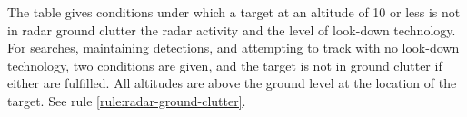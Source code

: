{\begin{twocolumntablefloat}[tp]
\begin{twocolumntable}
\begin{tabularx}{0.9\linewidth}{cCcCCC}
\bottomrule
\end{tabularx}
\begin{tablenote}{0.9\linewidth}\footnotesize
The table gives conditions under which a target at an altitude of 10 or less is not in radar ground clutter the radar activity and the level of look-down technology. For searches, maintaining detections, and attempting to track with no look-down technology, two conditions are given, and the target is not in ground clutter if either are fulfilled. All altitudes are above the ground level at the location of the target. See rule \ref{rule:radar-ground-clutter}.
\end{tablenote}

\end{twocolumntable}
\end{twocolumntablefloat}

}
